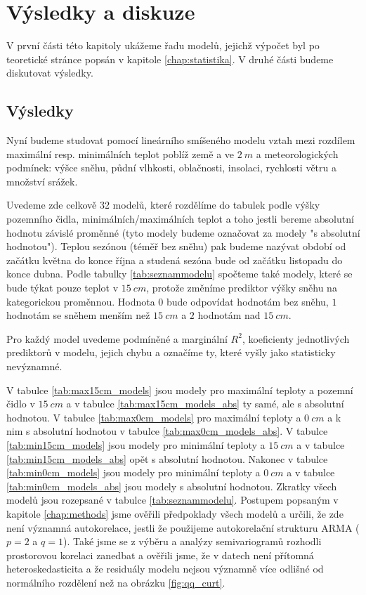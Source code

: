 \chapter{Výsledky a diskuze}\label{chap:ch3}
V první části této kapitoly ukážeme řadu modelů, jejichž výpočet byl po teoretické stránce popsán v kapitole \ref{chap:statistika}. V druhé části budeme diskutovat výsledky.

\section{Výsledky}
Nyní budeme studovat pomocí lineárního smíšeného modelu vztah mezi rozdílem maximální resp. minimálních teplot poblíž země a ve $\SI{2}{m}$ a meteorologických podmínek: výšce sněhu, půdní vlhkosti, oblačnosti, insolaci, rychlosti větru a množství srážek.

Uvedeme zde celkově 32 modelů, které rozdělíme do tabulek podle výšky pozemního čidla, minimálních/maximálních teplot a toho jestli bereme absolutní hodnotu závislé proměnné (tyto modely budeme označovat za modely "s absolutní hodnotou"). Teplou sezónou (téměř bez sněhu) pak budeme nazývat období od začátku května do konce října a studená sezóna bude od začátku listopadu do konce dubna. Podle tabulky \ref{tab:seznammodelu} spočteme také modely, které se bude týkat pouze teplot v $\SI{15}{cm}$, protože změníme prediktor výšky sněhu na kategorickou proměnnou. Hodnota $0$ bude odpovídat hodnotám bez sněhu, $1$ hodnotám se sněhem menším než $\SI{15}{cm}$ a $2$ hodnotám nad $\SI{15}{cm}$.

Pro každý model uvedeme podmíněné a marginální $R^2$, koeficienty jednotlivých prediktorů v modelu, jejich chybu a označíme ty, které vyšly jako statisticky nevýznamné.

V tabulce \ref{tab:max15cm_models} jsou modely pro maximální teploty a pozemní čidlo v $\SI{15}{cm}$ a v tabulce \ref{tab:max15cm_models_abs} ty samé, ale s absolutní hodnotou. V tabulce \ref{tab:max0cm_models} pro maximální teploty a $\SI{0}{cm}$ a k nim s absolutní hodnotou v tabulce \ref{tab:max0cm_models_abs}. V tabulce \ref{tab:min15cm_models} jsou modely pro minimální teploty a $\SI{15}{cm}$ a v tabulce \ref{tab:min15cm_models_abs} opět s absolutní hodnotou. Nakonec v tabulce \ref{tab:min0cm_models} jsou modely pro minimální teploty a $\SI{0}{cm}$ a v tabulce \ref{tab:min0cm_models_abs} jsou modely s absolutní hodnotou. Zkratky všech modelů jsou rozepsané v tabulce \ref{tab:seznammodelu}. Postupem popsaným v kapitole \ref{chap:methods} jsme ověřili předpoklady všech modelů a určili, že zde není významná autokorelace, jestli že použijeme autokorelační strukturu ARMA ($p=2$ a $q=1$). Také jsme se z výběru a analýzy semivariogramů rozhodli prostorovou korelaci zanedbat a ověřili jsme, že v datech není přítomná heteroskedasticita a že residuály modelu nejsou významně více odlišné od normálního rozdělení než na obrázku \ref{fig:qq_curt}.

